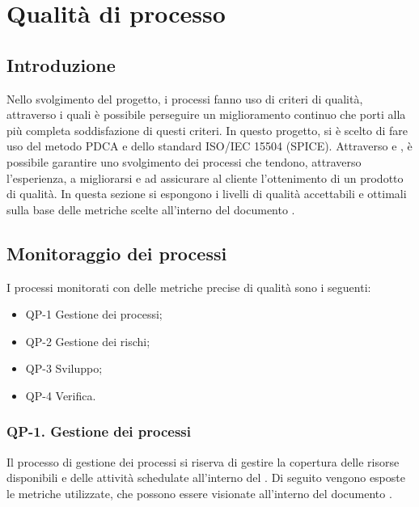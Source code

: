 \section{Qualità di processo}

\subsection{Introduzione}

Nello svolgimento del progetto, i processi fanno uso di criteri di qualità, attraverso i quali è possibile perseguire un miglioramento continuo che porti alla più completa soddisfazione di questi criteri.
\newline
In questo progetto, si è scelto di fare uso del metodo PDCA e dello standard ISO/IEC 15504 (SPICE). Attraverso  e , è possibile garantire uno svolgimento dei processi che tendono, attraverso l'esperienza, a migliorarsi e ad assicurare al cliente l'ottenimento di un prodotto di qualità.
\newline
In questa sezione si espongono i livelli di qualità accettabili e ottimali sulla base delle metriche scelte all'interno del documento .

\subsection{Monitoraggio dei processi}

I processi monitorati con delle metriche precise di qualità sono i seguenti:

\begin{itemize}
	\item QP-1 Gestione dei processi;
	\item QP-2 Gestione dei rischi;
 	\item QP-3 Sviluppo;
	\item QP-4 Verifica.
\end{itemize}

	\subsubsection{QP-1. Gestione dei processi}

		Il processo di gestione dei processi si riserva di gestire la copertura delle risorse disponibili e delle attività schedulate all'interno del .
		\newline
		Di seguito vengono esposte le metriche utilizzate, che possono essere visionate all'interno del documento .


